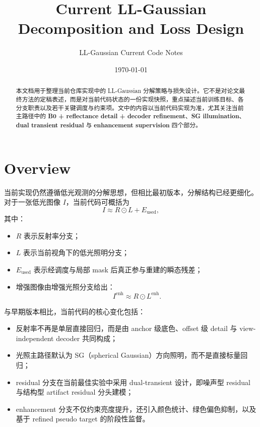\documentclass[11pt]{article}
\title{Current LL-Gaussian Decomposition and Loss Design}
\author{LL-Gaussian Current Code Notes}
\date{\today}
\begin{document}
\maketitle

\begin{abstract}
本文档用于整理当前仓库实现中的 LL-Gaussian 分解策略与损失设计。它不是对论文最终方法的定稿表述，而是对当前代码状态的一份实现快照，重点描述当前训练目标、各分支职责以及若干关键调度与约束项。文中的内容以当前代码实现为准，尤其关注当前主路径中的 \textbf{B0 + reflectance detail + decoder refinement}、\textbf{SG illumination}、\textbf{dual transient residual} 与 \textbf{enhancement supervision} 四个部分。
\end{abstract}

\section{Overview}

当前实现仍然遵循低光观测的分解思想，但相比最初版本，分解结构已经更细化。对于一张低光图像 $I$，当前代码可概括为
\begin{equation}
    I \approx R \odot L + E_{\text{used}},
\end{equation}
其中：
\begin{itemize}[leftmargin=1.5em]
    \item $R$ 表示反射率分支；
    \item $L$ 表示当前视角下的低光照明分支；
    \item $E_{\text{used}}$ 表示经调度与局部 mask 后真正参与重建的瞬态残差；
    \item 增强图像由增强光照分支给出：
    \begin{equation}
        I^{\text{enh}} \approx R \odot L^{\text{enh}}.
    \end{equation}
\end{itemize}

与早期版本相比，当前代码的核心变化包括：
\begin{itemize}[leftmargin=1.5em]
    \item 反射率不再是单层直接回归，而是由 anchor 级底色、offset 级 detail 与 view-independent decoder 共同构成；
    \item 光照主路径默认为 SG（spherical Gaussian）方向照明，而不是直接标量回归；
    \item residual 分支在当前最佳实验中采用 dual-transient 设计，即噪声型 residual 与结构型 artifact residual 分头建模；
    \item enhancement 分支不仅约束亮度提升，还引入颜色统计、绿色偏色抑制，以及基于 refined pseudo target 的阶段性监督。
\end{itemize}
\end{document}
